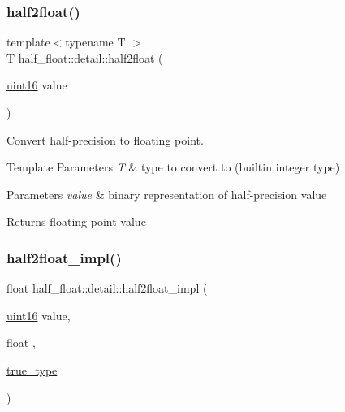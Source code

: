 \mbox{\label{namespacehalf__float_1_1detail_aacbda37363295f0d13fca10c223e8169}} 
\subsubsection{\texorpdfstring{half2float()}{half2float()}}
{\footnotesize\ttfamily template$<$typename T $>$ \\
T half\+\_\+float\+::detail\+::half2float (\begin{DoxyParamCaption}\item[{\hyperlink{namespacehalf__float_1_1detail_a239ec58092b4e4849b444baee1a01088}{uint16}}]{value }\end{DoxyParamCaption})}

Convert half-\/precision to floating point. 
\begin{DoxyTemplParams}{Template Parameters}
{\em T} & type to convert to (builtin integer type) \\
\hline
\end{DoxyTemplParams}

\begin{DoxyParams}{Parameters}
{\em value} & binary representation of half-\/precision value \\
\hline
\end{DoxyParams}
\begin{DoxyReturn}{Returns}
floating point value 
\end{DoxyReturn}
\mbox{\label{namespacehalf__float_1_1detail_a1f78a7e278b390a587dea90e02686e28}} 
\subsubsection{\texorpdfstring{half2float\+\_\+impl()}{half2float\_impl()}\hspace{0.1cm}{\footnotesize\ttfamily [1/3]}}
{\footnotesize\ttfamily float half\+\_\+float\+::detail\+::half2float\+\_\+impl (\begin{DoxyParamCaption}\item[{\hyperlink{namespacehalf__float_1_1detail_a239ec58092b4e4849b444baee1a01088}{uint16}}]{value,  }\item[{float}]{,  }\item[{\hyperlink{namespacehalf__float_1_1detail_a5e245748a3cc20e348dd92383d99d03c}{true\+\_\+type}}]{ }\end{DoxyParamCaption})\hspace{0.3cm}{\ttfamily [inline]}}

